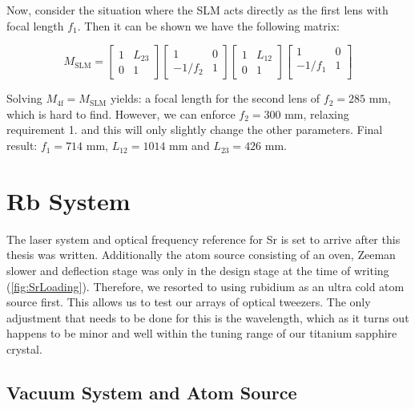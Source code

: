 Now, consider the situation where the SLM acts directly as the first lens with focal length $f_1$. Then it can be shown we have the following matrix:

\begin{equation}\label{LensSLM}
    M_{\text{SLM}} = 
    \begin{bmatrix}
        1 & L_{23}\\
        0 & 1
    \end{bmatrix}
    \begin{bmatrix}
        1 & 0\\
        -1/f_2& 1
    \end{bmatrix}
    \begin{bmatrix}
        1 & L_{12} \\
        0 & 1
    \end{bmatrix}
    \begin{bmatrix}
        1 & 0\\
        -1/f_1& 1\\
    \end{bmatrix}
\end{equation}

Solving $M_{\text{4f}} = M_{\text{SLM}}$ yields: a focal length for the second lens of $f_2 = 285$ mm, which is hard to find. However, we can enforce $f_2 = 300$ mm, relaxing requirement 1. and this will only slightly change the other parameters. Final result: $f_1 = 714$ mm, $L_{12} = 1014$ mm and $L_{23} = 426$ mm. 

\section{Rb System}

The laser system and optical frequency reference for Sr is set to arrive after this thesis was written. Additionally the atom source consisting of an oven, Zeeman slower and deflection stage was only in the design stage at the time of writing (\cref{fig:SrLoading}). Therefore, we resorted to using rubidium as an ultra cold atom source first. This allows us to test our arrays of optical tweezers. The only adjustment that needs to be done for this is the wavelength, which as it turns out happens to be minor and well within the tuning range of our titanium sapphire crystal. 

\subsection{Vacuum System and Atom Source}

